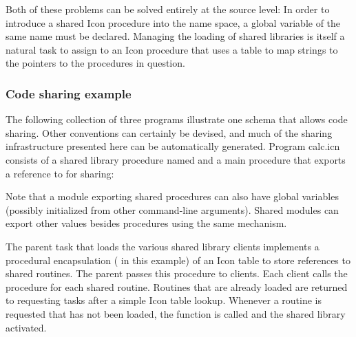 Both of these problems can be solved entirely at the source level: In
order to introduce a shared Icon procedure into the name space, a
global variable of the same name must be declared. Managing the loading
of shared libraries is itself a natural task to assign to an Icon
procedure that uses a table to map strings to the pointers to the
procedures in question. 

\subsubsection{Code sharing example}

The following collection of three programs illustrate one schema that
allows code sharing. Other conventions can certainly be devised, and
much of the sharing infrastructure presented here can be automatically
generated. Program calc.icn consists of a shared library procedure
named  and a main procedure that
exports a reference to  for
sharing: 


Note that a module exporting shared procedures can also have global
variables (possibly initialized from other command-line arguments).
Shared modules can export other values besides procedures using the
same mechanism.

The parent task that loads the various shared library clients implements
a procedural encapsulation ( in
this example) of an Icon table to store references to shared routines.
The parent passes this procedure to clients. Each client calls the
procedure for each shared routine. Routines that are already loaded are
returned to requesting tasks after a simple Icon table lookup. Whenever
a routine is requested that has not been loaded, the
 function is called and the shared
library activated. 

